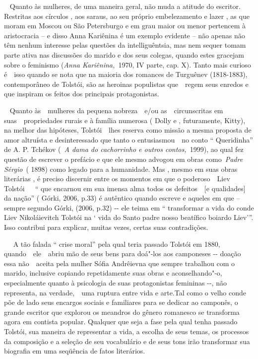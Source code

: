 ~ Quanto às mulheres, de uma maneira geral, não muda a atitude do
escritor. Restritas aos círculos , aos saraus, ao seu próprio
embelezamento e lazer , as que moram em Moscou ou São Petersburgo e em
grau maior ou menor pertencem à aristocracia -- e disso Anna Kariênina é
um exemplo evidente -- não apenas não têm nenhum interesse pelas
questões da intelliguêntsia, mas nem sequer tomam parte ativa nas
discussões do marido e dos seus colegas, quando estes gracejam sobre o
feminismo (\emph{Anna Kariênina,~}1970, IV parte, cap. X). Tanto mais
curioso é~~isso quando se nota que na maioria dos romances de Turguênev
(1818-1883), contemporâneo de Tolstói, são as heroinas populistas
que~~regem seus enredos e que inspiram os feitos dos principais
protagonistas.

~ Quanto às~~mulheres da pequena nobreza~~e/ou as~~circunscritas em
suas~~propriedades rurais e à família numerosa ( Dolly e , futuramente,
Kitty), na melhor das hipóteses, Tolstói~~lhes reserva como missão a
mesma proposta de amor altruísta e desinteressado que tanto o
entusiasmou~~no conto `` Queridinha'' de A. P. Tchékov (~\emph{A dama do
cachorrinho e outros contos,~}1999), ao qual fez questão de escrever o
prefácio e que ele mesmo advogou em obras como~\emph{Padre Sérgio}~(
1898) como legado para a humanidade. Mas , mesmo em suas obras
literárias , é preciso discernir entre os momentos em que o
poderoso~~Liev Tolstói~~~`` que encarnou em sua imensa alma todos os
defeitos~~{[}e qualidades{]} da nação'' ( Górki, 2006, p.33) é autêntico
quando escreve e aqueles em que -- sempre segundo Górki, (2006, p.32)
-\/- ele teima em `` transformar a vida do conde Liev Nikoláievitch
Tolstói na ` vida do Santo padre nosso beatífico boiardo Liev'''. Isso
contribui para explicar, muitas vezes, certas suas contradições.

~~ A tão falada `` crise moral'' pela qual teria passado Tolstói em
1880, quando~~ele~~abriu mão de seus bens para doá"-los aos camponeses
-\/- doação essa não~~aceita pela mulher Sófia Andrêievna que sempre
trabalhou com o marido, inclusive copiando repetidamente suas obras e
aconselhando"-o, especialmente quanto à psicologia de suas protagonistas
femininas -\/-, não representa, na verdade,~~uma ruptura entre vida e
arte.Tal como o velho conde põe de lado seus encargos sociais e
familiares para se dedicar ao camponês, o grande escritor que explorou
os meandros do gênero romanesco se transforma agora em contista popular.
Qualquer que seja a fase pela qual tenha passado Tolstói, sua maneira de
representar a vida, a escolha de seus temas, os processos da composição
e a seleção de seu vocabulário e de seus tons irão transformar sua
biografia em uma seqüência de fatos literários.


